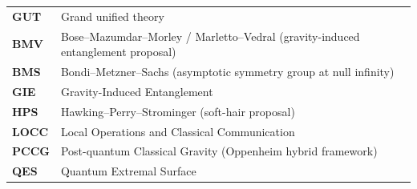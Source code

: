 \documentclass[11pt,a4paper]{article}
\begin{document}
\begin{longtable}{@{}p{2.6cm}p{12.6cm}@{}}
\textbf{GUT} & Grand unified theory \\
\textbf{BMV} & Bose--Mazumdar--Morley / Marletto--Vedral (gravity-induced entanglement proposal) \\
\textbf{BMS} & Bondi--Metzner--Sachs (asymptotic symmetry group at null infinity) \\
\textbf{GIE} & Gravity-Induced Entanglement \\
\textbf{HPS} & Hawking--Perry--Strominger (soft-hair proposal) \\
\textbf{LOCC} & Local Operations and Classical Communication \\
\textbf{PCCG} & Post-quantum Classical Gravity (Oppenheim hybrid framework) \\
\textbf{QES} & Quantum Extremal Surface \\
\end{longtable}
\end{document}

